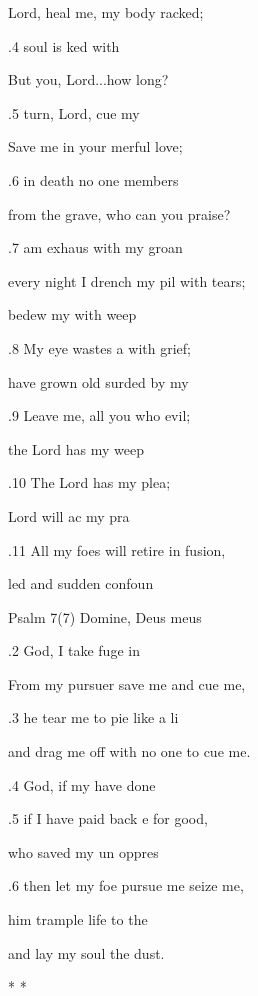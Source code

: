 Lord, heal me, my body  racked; 

.4  soul is ked with  

But you,  Lord...how long? 

.5 turn, Lord, cue my  

Save me in your merful love; 

.6  in death no one members  

from the grave, who can  you praise? 

.7  am exhaus with my groan 

every night I drench my pil with tears; 

 bedew my  with weep 

.8 My eye wastes a with grief; 

 have grown old surded by my  

.9 Leave me, all you who  evil; 

 the Lord has  my weep 

.10 The Lord has  my plea; 

 Lord will ac my pra 

.11 All my foes will retire in fusion, 

led and sudden confoun 

Psalm 7(7) Domine, Deus meus 


.2  God, I take fuge in  

From my pursuer save me and cue me, 

.3  he tear me to pie like a li 

and drag me off with no one to cue me. 

.4  God, if my  have done  

.5 if I have paid back e for good, 

 who saved my un oppres 

.6 then let my foe pursue me  seize me, 

 him trample  life to the  

and lay my soul  the dust. 

\mi{*} \pl{* * *} * * \pl{*} 

